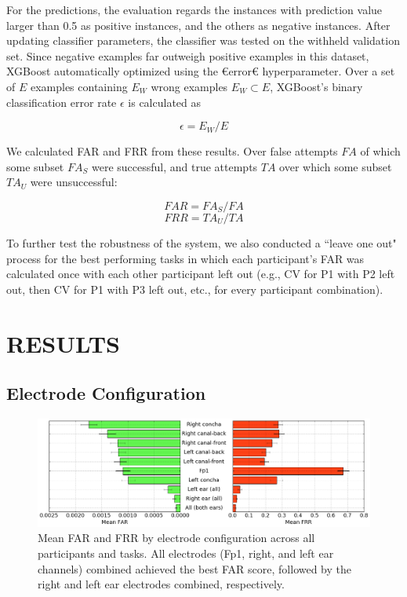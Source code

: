 \documentclass[a4paper,twoside]{article}
\begin{document}
For the predictions, the evaluation regards the instances with prediction value larger than 0.5 as positive instances, and the others as negative instances. After updating classifier parameters, the classifier was tested on the withheld validation set. Since negative examples far outweigh positive examples in this dataset, XGBoost automatically optimized using the €error€ hyperparameter. Over a set of \(E\) examples containing \(E_W\) wrong examples \(E_W\subset{E}\), XGBoost's binary classification error rate \(\epsilon\) is calculated as

\begin{equation}\label{eq1}
     \epsilon = E_W / E
\end{equation}

We calculated FAR and FRR from these results. Over false attempts \(FA\) of which some subset \(FA_S\) were successful, and true attempts \(TA\) over which some subset \(TA_U\) were unsuccessful:

\begin{equation}\label{eq2}
     FAR = FA_S / FA
\end{equation}
\begin{equation}\label{eq3}
     FRR = TA_U / TA
\end{equation}

To further test the robustness of the system, we also conducted a ``leave one out" process for the best performing tasks in which each participant's FAR was calculated once with each other participant left out (e.g., CV for P1 with P2 left out, then CV for P1 with P3 left out, etc., for every participant combination).

\section{\uppercase{Results}}
\label{sec:Results}
\subsection{Electrode Configuration}

\begin{figure}[t]
\centering
\includegraphics[width=.9\linewidth]{./figures/mean-far-and-frr-by-electrode-config.png}
\caption{Mean FAR and FRR by electrode configuration across all participants and tasks. All electrodes (Fp1, right, and left ear channels) combined achieved the best FAR score, followed by the right and left ear electrodes combined, respectively.}
\label{fig:meanByElectrode}
\end{figure}
\end{document}
